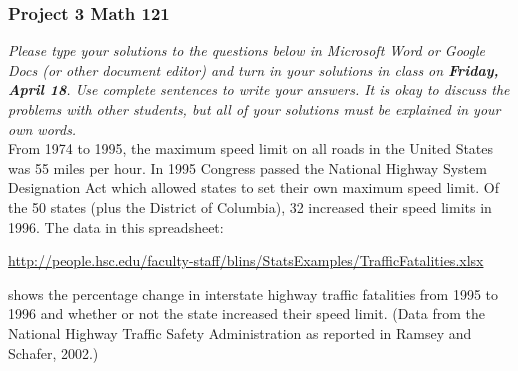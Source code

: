 \documentclass[12pt]{exam}
\begin{document}
\subsubsection*{Project 3 \hfill Math 121}

\textit{Please type your solutions to the questions below in Microsoft Word or Google Docs (or other document editor) and turn in your solutions in class on \textbf{Friday, April 18}. Use complete sentences to write your answers.  It is okay to discuss the problems with other students, but all of your solutions must be explained in your own words. }  \\

\noindent
From 1974 to 1995, the maximum speed limit on all roads in the United States was 55 miles per hour.  In 1995 Congress passed the National Highway System Designation Act which allowed states to set their own maximum speed limit. Of the 50 states (plus the District of Columbia), 32 increased their speed limits in 1996. The data in this spreadsheet:
\begin{center}
{\small
\url{http://people.hsc.edu/faculty-staff/blins/StatsExamples/TrafficFatalities.xlsx}
}
\end{center}
shows the percentage change in interstate highway traffic fatalities from 1995 to 1996 and whether or not the state
increased their speed limit. (Data from the National Highway Traffic Safety Administration as reported
in Ramsey and Schafer, 2002.)
\end{document}
